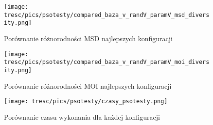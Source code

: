 \clearpage

\begin{figure}[H]
\begin{center} 
\texttt{[image: tresc/pics/psotesty/compared\_baza\_v\_randV\_paramV\_msd\_diversity.png]}
\caption{Porównanie różnorodności MSD najlepszych konfiguracji}
\label{fig:compared_baza_v_randV_paramV_msd_diversity}
\end{center}
\end{figure}

\begin{figure}[H]
\begin{center} 
\texttt{[image: tresc/pics/psotesty/compared\_baza\_v\_randV\_paramV\_moi\_diversity.png]}
\caption{Porównanie różnorodności MOI najlepszych konfiguracji}
\label{fig:compared_baza_v_randV_paramV_moi_diversity}
\end{center}
\end{figure}


\begin{figure}[H]
\begin{center} 
\texttt{[image: tresc/pics/psotesty/czasy\_psotesty.png]}
\caption{Porównanie czasu wykonania dla każdej konfiguracji}
\label{fig:czasy_psotesty}
\end{center}
\end{figure}


